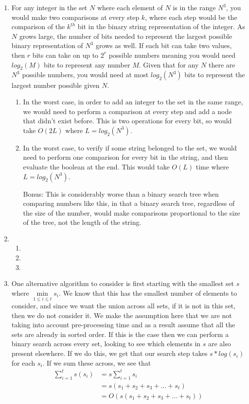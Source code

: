 \documentclass[11pt,a4paper]{article}
\begin{document}
\begin{enumerate}
		\item For any integer in the set $N$ where each element of $N$ is in the range $N^3$, you would make two comparisons at every step $k$, where each step would be the comparison of the $k^{th}$ bit in the binary string representation of the integer. As $N$ grows large, the number of bits needed to represent the largest possible binary representation of $N^3$ grows as well. If each bit can take two values, then $r$ bits can take on up to $2^r$ possible numbers meaning you would need $log_2 (M)$ bits to represent any number $M$. Given that for any $N$ there are $N^3$ possible numbers, you would need at most $log_2 (N^3)$ bits to represent the largest number possible given $N$.
		\begin{enumerate}
		\item In the worst case, in order to add an integer to the set in the same range, we would need to perform a comparison at every step and add a node that didn't exist before. This is two operations for every bit, so would take $O(2L)$ where $L=log_2 (N^3)$.
		\item In the worst case, to verify if some string belonged to the set, we would need to perform one comparison for every bit in the string, and then evaluate the boolean at the end. This would take $O(L)$ time where $L=log_2 (N^3)$.
		\end{enumerate}
		\begin{itemize}
			\item [Bonus:] This is considerably worse than a binary search tree when comparing numbers like this, in that a binary search tree, regardless of the size of the number, would make comparisons proportional to the size of the tree, not the length of the string.
		\end{itemize}
		
		\item
		\begin{enumerate}
			\item
			\item
			\item
		\end{enumerate}
		
		\item One alternative algorithm to consider is first starting with the smallest set $s$ where $\min\limits_{1\leq i \leq t} s_i$. We know that this has the smallest number of elements to consider, and since we want the union across all sets, if it is not in this set, then we do not consider it. We make the assumption here that we are not taking into account pre-processing time and as a result assume that all the sets are already in sorted order. If this is the case then we can perform a binary search across every set, looking to see which elements in $s$ are also present elsewhere. If we do this, we get that our search step takes $s*log(s_i)$ for each $s_i$. If we sum these across, we see that
		\begin{align*}
		\sum_{i=1}^{t} s(s_i) &= s\sum_{i=1}^{t}s_i \\
		&= 	s(s_1 + s_2 + s_3 + \dots + s_t) \\
		&=  O(s(s_1 + s_2 + s_3 + \dots + s_t))
		\end{align*}
		

\end{enumerate}
\end{document}
